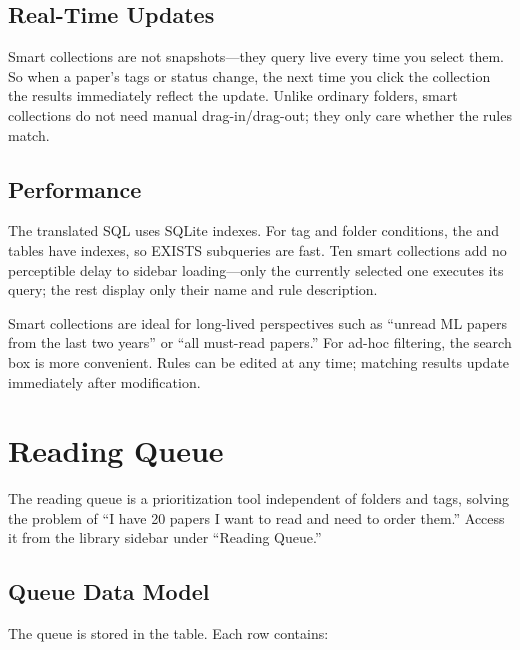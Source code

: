 \subsection{Real-Time Updates}

Smart collections are not snapshots---they query live every time you select them. So
when a paper's tags or status change, the next time you click the collection the results
immediately reflect the update. Unlike ordinary folders, smart collections do not need
manual drag-in/drag-out; they only care whether the rules match.

\subsection{Performance}

The translated SQL uses SQLite indexes. For tag and folder conditions, the
 and  tables have  indexes, so
EXISTS subqueries are fast. Ten smart collections add no perceptible delay to sidebar
loading---only the currently selected one executes its query; the rest display only
their name and rule description.

\begin{tipbox}
Smart collections are ideal for long-lived perspectives such as ``unread ML papers
from the last two years'' or ``all must-read papers.'' For ad-hoc filtering, the search
box is more convenient. Rules can be edited at any time; matching results update
immediately after modification.
\end{tipbox}

\section{Reading Queue}

The reading queue is a prioritization tool independent of folders and tags, solving
the problem of ``I have 20 papers I want to read and need to order them.'' Access it
from the library sidebar under ``Reading Queue.''


\subsection{Queue Data Model}

The queue is stored in the  table. Each row contains:

